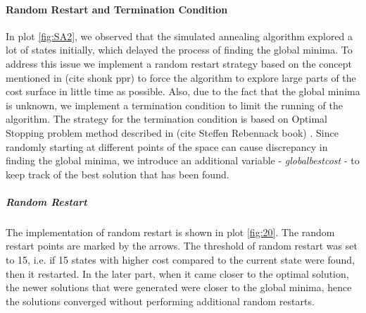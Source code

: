 \paragraph{Random Restart and Termination Condition}
In plot \ref{fig:SA2}, we observed that the simulated annealing algorithm explored a lot of states initially, which delayed the process of finding the global minima. To address this issue we implement a random restart strategy based on the concept mentioned in (cite shonk ppr) to force the algorithm to explore large parts of the cost surface in little time as possible. Also, due to the fact that the global minima is unknown, we implement a termination condition to limit the running of the algorithm. The strategy for the termination condition is based on Optimal Stopping problem method described in (cite  Steffen Rebennack book) . Since randomly starting at different points of the space can cause discrepancy in finding the global minima, we introduce an additional variable - \textit{globalbestcost} - to keep track of the best solution that has been found. 
\subparagraph{Random Restart}
The implementation of random restart is shown in plot \ref{fig:20}. The random restart points are marked by the arrows. The threshold of random restart was set to 15, i.e. if 15 states with higher cost compared to the current state were found, then it restarted. In the later part, when it came closer to the optimal solution, the newer solutions that were generated were closer to the global minima, hence the solutions converged without performing additional random restarts.
